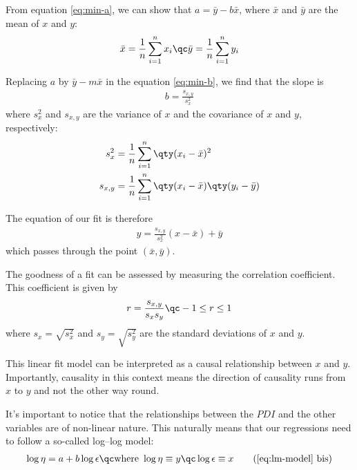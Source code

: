 From equation \eqref{eq:min-a}, we can show that $a = \bar{y} - b \bar{x}$,
where $\bar{x}$ and $\bar{y}$ are the mean of $x$ and $y$:
\begin{align}
	\bar{x} = \frac{1}{n} \sum_{i=1}^{n} x_{i} \qc \bar{y} = \frac{1}{n} \sum_{i=1}^{n} y_{i}
\end{align}

Replacing $a$ by $\bar{y} - m \bar{x}$ in the equation \eqref{eq:min-b}, we find that the slope is
\begin{align}
	b = \frac{s_{x,y}}{s_{x}^{2}}
\end{align}
where $s_{x}^{2}$ and $s_{x,y}$ are the variance of $x$ and the covariance of $x$ and $y$, respectively:
\begin{subequations}
\begin{align}
	s_{x}^{2} &= \frac{1}{n} \sum_{i=1}^{n} \qty(x_{i} - \bar{x})^{2} \\
	s_{x,y} &= \frac{1}{n} \sum_{i=1}^{n} \qty(x_{i} - \bar{x}) \qty(y_{i} - \bar{y})
\end{align}
\end{subequations}

The equation of our fit is therefore
\begin{align}\label{eq:linear-fit}
	y = \frac{s_{x,y}}{s_{x}^{2}} (x - \bar{x}) + \bar{y}
\end{align}
which passes through the point $(\bar{x}, \bar{y})$.

\sk
The goodness of a fit can be assessed by measuring the correlation coefficient. This
coefficient is given by
\begin{align}
	r = \frac{s_{x,y}}{s_{x} s_{y}} \qc -1 \le r \le 1
\end{align}
where $s_{x} = \sqrt{s_{x}^{2}}$ and $s_{y} = \sqrt{s_{y}^{2}}$ are the standard deviations of $x$ and $y$.

\sk
This linear fit model can be interpreted as a causal relationship between $x$ and $y$. Importantly, causality in this context means the direction of causality runs from $x$ to $y$ and not the other way round.

It's important to notice that the relationships between the $PDI$ and the other variables are of non-linear nature. This naturally means that our regressions need to follow a so-called log--log model:
\begin{align}\label{eq:lm-model-bis}
	\log \eta = a + b \log \epsilon \qc \text{where }
	\log \eta \equiv y \qc
	\log \epsilon \equiv x
	\tag{\ref{eq:lm-model} bis}
\end{align}

